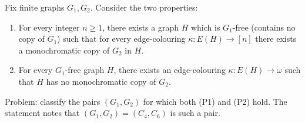 Fix finite graphs $G_1,G_2$.
Consider the two properties:
\begin{enumerate}
\item[(P1)] For every integer $n\ge 1$, there exists a graph $H$ which is $G_1$-free (contains no copy of $G_1$) such that for every edge-colouring $\kappa:E(H)\to[n]$ there exists a monochromatic copy of $G_2$ in $H$.
\item[(P2)] For every $G_1$-free graph $H$, there exists an edge-colouring $\kappa:E(H)\to\omega$ such that $H$ has no monochromatic copy of $G_2$.
\end{enumerate}

Problem: classify the pairs $(G_1,G_2)$ for which both (P1) and (P2) hold.
The statement notes that $(G_1,G_2)=(C_4,C_6)$ is such a pair.
